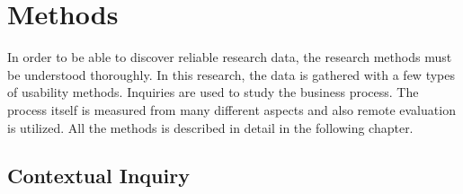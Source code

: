 \documentclass[12pt,a4paper,oneside,pdftex]{report}
\begin{document}



% 

\chapter{Methods}
\label{chapter:methods}
In order to be able to discover reliable research data, the research methods must be understood thoroughly. In this research, the data is gathered with a few types of usability methods.
Inquiries are used to study the business process. The process itself is measured from many different aspects and also remote evaluation is utilized.
All the methods is described in detail in the following chapter. 


\section{Contextual Inquiry}
\label{sec:cinquiry}
\end{document}
